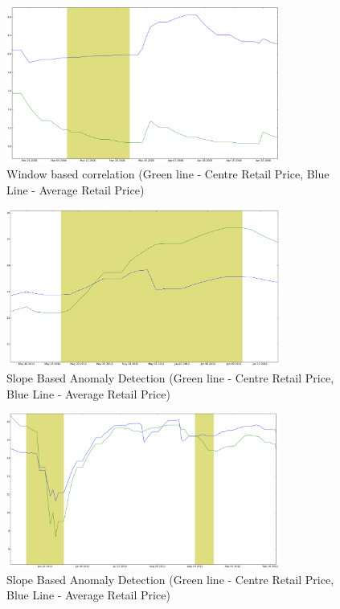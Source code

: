 \begin{figure}[H]
\centering
\includegraphics[width=0.8\textwidth]{graphs/20080306_0320.png}
\caption{Window based correlation (Green line - Centre Retail Price, Blue Line - Average Retail Price)}
\label{fig:20080306_0320}
\end{figure}

\begin{figure}[H]
\centering
\includegraphics[width=0.8\textwidth]{graphs/12111.png}
\caption{Slope Based Anomaly Detection (Green line - Centre Retail Price, Blue Line - Average Retail Price)}
\label{fig:12111}
\end{figure}

\begin{figure}[H]
\centering
\includegraphics[width=0.8\textwidth]{graphs/12112.png}
\caption{Slope Based Anomaly Detection (Green line - Centre Retail Price, Blue Line - Average Retail Price)}
\label{fig:12112}
\end{figure}

